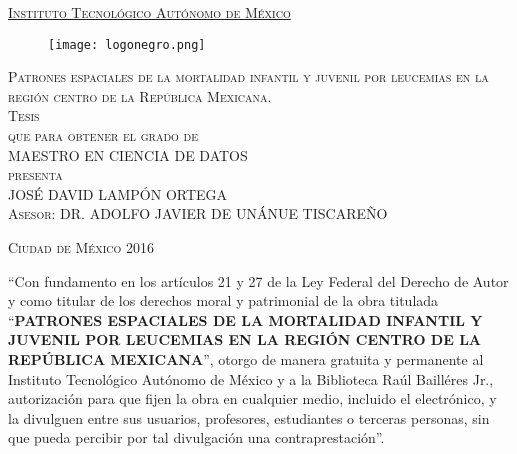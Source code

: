 \documentclass[11pt, oneside]{book}
\begin{document}
\begin{titlepage}
\begin{center}

\underline{\textsc{\Large Instituto Tecnológico Autónomo de México}}\\[4em]

\begin{figure}[h]
\begin{center}
\texttt{[image: logonegro.png]}
\end{center}
\end{figure}

\vspace{3em}

\textsc{\Large Patrones espaciales de la mortalidad infantil y juvenil por leucemias en la región centro de la República Mexicana.}\\[3em]

\textsc{\large Tesis}\\[1.5em]

\textsc{\large que para obtener el grado de}\\[1.5em]

\textsc{\large MAESTRO EN CIENCIA DE DATOS}\\[1.5em]

\textsc{\large presenta}\\[1.5em]

\textsc{\Large JOSÉ DAVID LAMPÓN ORTEGA}\\[1.5em]

\textsc{\large Asesor: DR. ADOLFO JAVIER DE UNÁNUE TISCAREÑO}

\end{center}

\vspace*{\fill}
\textsc{Ciudad de México \hspace*{\fill} 2016}

\end{titlepage}


\thispagestyle{empty}
\vspace{3em}
\begingroup
\noindent ``Con fundamento en los artículos 21 y 27 de la Ley Federal del Derecho de Autor y como titular de los derechos moral y patrimonial de la obra titulada ``\textbf{PATRONES ESPACIALES DE LA MORTALIDAD INFANTIL Y JUVENIL POR LEUCEMIAS EN LA REGIÓN CENTRO DE LA REPÚBLICA MEXICANA}'', otorgo de manera gratuita y permanente al Instituto Tecnológico Autónomo de México y a la Biblioteca Raúl Bailléres Jr., autorización para que fijen la obra en cualquier medio, incluido el electrónico, y la divulguen entre sus usuarios, profesores, estudiantes o terceras personas, sin que pueda percibir por tal divulgación una contraprestación''.
\end{document}
